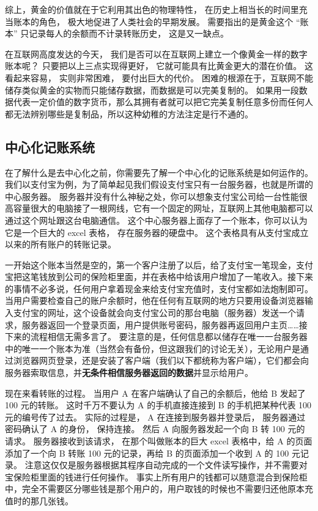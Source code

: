 综上，黄金的价值就在于它利用其出色的物理特性， 在历史上相当长的时间里充当账本的角色， 极大地促进了人类社会的早期发展。 需要指出的是黄金这个 “账本” 只记录每人的余额而不计录转账历史， 这是又一缺点。

在互联网高度发达的今天， 我们是否可以在互联网上建立一个像黄金一样的数字账本呢？ 只要把以上三点实现得更好， 它就可能具有比黄金更大的潜在价值。 这看起来容易， 实则非常困难， 要付出巨大的代价。 困难的根源在于，互联网不能储存类似黄金的实物而只能储存数据，而数据是可以完美复制的。 如果用一段数据代表一定价值的数字货币，那么其拥有者就可以把它完美复制任意多份而任何人都无法辨别哪些是复制品，所以这种幼稚的方法注定是行不通的。

\subsection{中心化记账系统}
在了解什么是去中心化之前，你需要先了解一个中心化的记账系统是如何运作的。我们以支付宝为例，为了简单起见我们假设支付宝只有一台服务器，也就是所谓的中心服务器。 服务器并没有什么神秘之处，你可以想象支付宝公司给一台性能很高容量很大的电脑接了一根网线，它有一个固定的网址，互联网上其他电脑都可以通过这个网址跟这台电脑通信。 这个中心服务器上面存了一个账本，你可以认为它是一个巨大的 excel 表格， 存在服务器的硬盘中。 这个表格具有从支付宝成立以来的所有账户的转账记录。

一开始这个账本当然是空的，第一个客户注册了以后，给了支付宝一笔现金，支付宝把这笔钱放到公司的保险柜里面，并在表格中给该用户增加了一笔收入。接下来的事情不必多说，任何用户拿着现金来给支付宝充值时，支付宝都如法炮制即可。 当用户需要检查自己的账户余额时，他在任何有互联网的地方只要用设备浏览器输入支付宝的网址，这个设备就会向支付宝公司的那台电脑（服务器）发送一个请求，服务器返回一个登录页面，用户提供账号密码，服务器再返回用户主页……接下来的流程相信无需多言了。 要注意的是，任何信息都以储存在唯一一台服务器中的唯一一个账本为准（当然会有备份，但这跟我们的讨论无关），无论用户是通过浏览器网页登录，还是安装了客户端（我们以下都统称为客户端），它们都会向服务器索取信息，并\textbf{无条件相信服务器返回的数据}并显示给用户。

现在来看转账的过程。 当用户 A 在客户端确认了自己的余额后，他给 B 发起了 100 元的转账。 这时千万不要认为 A 的手机直接连接到 B 的手机把某种代表 100 元的编号传了过去。 实际的过程是， A 在连接到服务器并登录后， 服务器通过密码确认了 A 的身份， 保持连接。 然后 A 向服务器发起一个向 B 转 100 元的请求。 服务器接收到该请求， 在那个叫做账本的巨大 excel 表格中，给 A 的页面添加了一个向 B 转账 100 元的记录，再给 B 的页面添加一个收到 A 的 100 元记录。 注意这仅仅是服务器根据其程序自动完成的一个文件读写操作，并不需要对宝保险柜里面的钱进行任何操作。 事实上所有用户的钱都可以随意混合到保险柜中，完全不需要区分哪些钱是那个用户的，用户取钱的时候也不需要归还他原本充值时的那几张钱。

